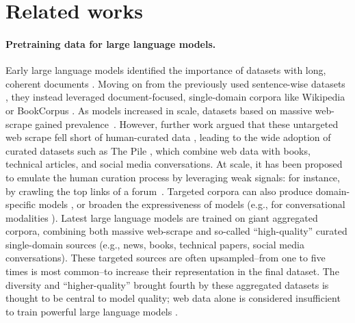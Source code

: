\section{Related works}

\paragraph{Pretraining data for large language models.} Early large language models identified the importance of datasets with long, coherent documents \cite{radford2018improving, devlin2019bert}. Moving on from the previously used sentence-wise datasets \cite{chelba2013one}, they instead leveraged document-focused, single-domain corpora like Wikipedia or BookCorpus \cite{zhu2015aligning}. As models increased in scale, datasets based on massive web-scrape gained prevalence~\cite{OrtizSuarezSagotRomary2019, 2020t5}. However, further work argued that these untargeted web scrape fell short of human-curated data \cite{radford2019language}, leading to the wide adoption of curated datasets such as The Pile \cite{gao2020pile}, which combine web data with books, technical articles, and social media conversations. At scale, it has been proposed to emulate the human curation process by leveraging weak signals: for instance, by crawling the top links of a forum~\cite{Gokaslan2019OpenWeb}. Targeted corpora can also produce domain-specific models \cite{beltagy2019scibert}, or broaden the expressiveness of models (e.g., for conversational modalities \citet{adiwardana2020towards, thoppilan2022lamda}). Latest large language models \cite{brown2020language, gopher, chowdhery2022palm, scao2022bloom} are trained on giant aggregated corpora, combining both massive web-scrape and so-called ``high-quality'' curated single-domain sources (e.g., news, books, technical papers, social media conversations). These targeted sources are often upsampled--from one to five times is most common--to increase their representation in the final dataset. The diversity and ``higher-quality'' brought fourth by these aggregated datasets is thought to be central to model quality; web data alone is considered insufficient to train powerful large language models \cite{liu2019roberta, scao2022language}.

